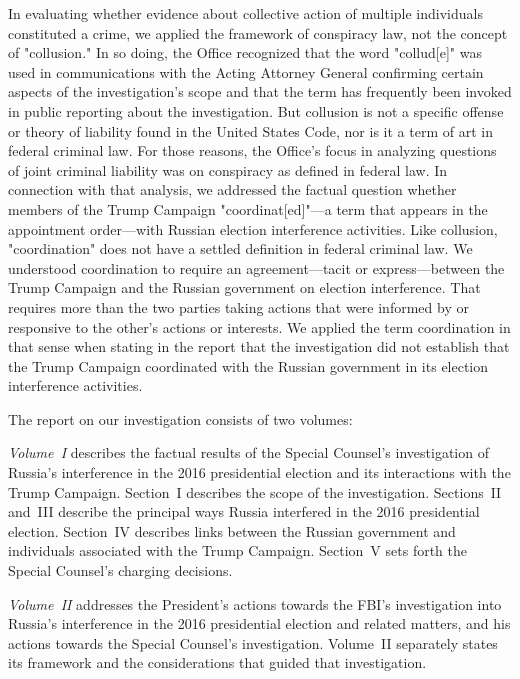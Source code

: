 In evaluating whether evidence about collective action of multiple individuals constituted a crime, we applied the framework of conspiracy law, not the concept of "collusion."
In so doing, the Office recognized that the word "collud[e]" was used in communications with the Acting Attorney General confirming certain aspects of the investigation's scope and that the term has frequently been invoked in public reporting about the investigation.
But collusion is not a specific offense or theory of liability found in the United States Code, nor is it a term of art in federal criminal law.
For those reasons, the Office's focus in analyzing questions of joint criminal liability was on conspiracy as defined in federal law.
In connection with that analysis, we addressed the factual question whether members of the Trump Campaign "coordinat[ed]"---a term that appears in the appointment order---with Russian election interference activities.
Like collusion, "coordination" does not have a settled definition in federal criminal law.
We understood coordination to require an agreement---tacit or express---between the Trump Campaign and the Russian government on election interference.
That requires more than the two parties taking actions that were informed by or responsive to the other's actions or interests.
We applied the term coordination in that sense when stating in the report that the investigation did not establish that the Trump Campaign coordinated with the Russian government in its election interference activities.

\hr

The report on our investigation consists of two volumes:

\textit{Volume~I} describes the factual results of the Special Counsel's investigation of Russia's interference in the 2016 presidential election and its interactions with the Trump Campaign.
Section~I describes the scope of the investigation.
Sections~II and~III describe the principal ways Russia interfered in the 2016 presidential election.
Section~IV describes links between the Russian government and individuals associated with the Trump Campaign.
Section~V sets forth the Special Counsel's charging decisions.

\textit{Volume~II} addresses the President's actions towards the FBI's investigation into Russia's interference in the 2016 presidential election and related matters, and his actions towards the Special Counsel's investigation.
Volume~II separately states its framework and the considerations that guided that investigation.
